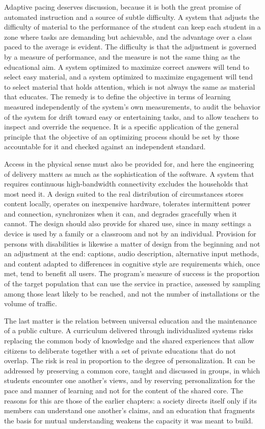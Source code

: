 Adaptive pacing deserves discussion, because it is both the great promise of automated instruction and a source of subtle difficulty. A system that adjusts the difficulty of material to the performance of the student can keep each student in a zone where tasks are demanding but achievable, and the advantage over a class paced to the average is evident. The difficulty is that the adjustment is governed by a measure of performance, and the measure is not the same thing as the educational aim. A system optimized to maximize correct answers will tend to select easy material, and a system optimized to maximize engagement will tend to select material that holds attention, which is not always the same as material that educates. The remedy is to define the objective in terms of learning measured independently of the system's own measurements, to audit the behavior of the system for drift toward easy or entertaining tasks, and to allow teachers to inspect and override the sequence. It is a specific application of the general principle that the objective of an optimizing process should be set by those accountable for it and checked against an independent standard.

Access in the physical sense must also be provided for, and here the engineering of delivery matters as much as the sophistication of the software. A system that requires continuous high-bandwidth connectivity excludes the households that most need it. A design suited to the real distribution of circumstances stores content locally, operates on inexpensive hardware, tolerates intermittent power and connection, synchronizes when it can, and degrades gracefully when it cannot. The design should also provide for shared use, since in many settings a device is used by a family or a classroom and not by an individual. Provision for persons with disabilities is likewise a matter of design from the beginning and not an adjustment at the end: captions, audio description, alternative input methods, and content adapted to differences in cognitive style are requirements which, once met, tend to benefit all users. The program's measure of success is the proportion of the target population that can use the service in practice, assessed by sampling among those least likely to be reached, and not the number of installations or the volume of traffic.

The last matter is the relation between universal education and the maintenance of a public culture. A curriculum delivered through individualized systems risks replacing the common body of knowledge and the shared experiences that allow citizens to deliberate together with a set of private educations that do not overlap. The risk is real in proportion to the degree of personalization. It can be addressed by preserving a common core, taught and discussed in groups, in which students encounter one another's views, and by reserving personalization for the pace and manner of learning and not for the content of the shared core. The reasons for this are those of the earlier chapters: a society directs itself only if its members can understand one another's claims, and an education that fragments the basis for mutual understanding weakens the capacity it was meant to build.

